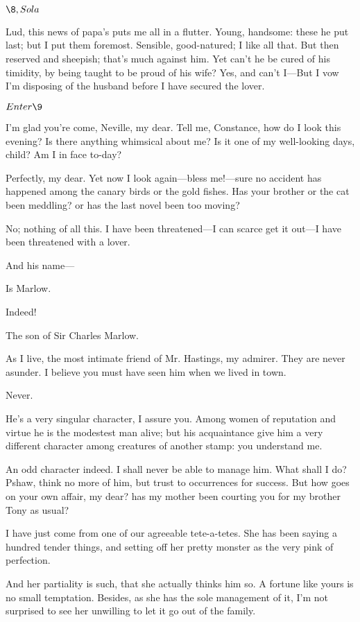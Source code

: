 \documentclass{book}
\begin{document}
    \(\8, Sola\)

\8   Lud, this news of papa's puts me all in a
flutter.  Young, handsome: these he put last; but I put them foremost. 
Sensible, good-natured; I like all that.  But then reserved and
sheepish; that's much against him.  Yet can't he be cured of his
timidity, by being taught to be proud of his wife?  Yes, and can't
I---But I vow I'm disposing of the husband before I have secured the
lover.


\(Enter \9\)


\8  I'm glad you're come, Neville, my dear.  Tell me,
Constance, how do I look this evening?  Is there anything whimsical
about me?  Is it one of my well-looking days, child?  Am I in face
to-day?

\9  Perfectly, my dear.  Yet now I look again---bless
me!---sure no accident has happened among the canary birds or the gold
fishes.  Has your brother or the cat been meddling? or has the last
novel been too moving?

\8  No; nothing of all this.  I have been threatened---I
can scarce get it out---I have been threatened with a lover.

\9  And his name---

\8  Is Marlow.

\9  Indeed!

\8  The son of Sir Charles Marlow.

\9  As I live, the most intimate friend of Mr. Hastings, my
admirer.  They are never asunder.  I believe you must have seen him
when we lived in town.

\8  Never.

\9  He's a very singular character, I assure you.  Among
women of reputation and virtue he is the modestest man alive; but his
acquaintance give him a very different character among creatures of
another stamp: you understand me.

\8  An odd character indeed.  I shall never be able to
manage him.  What shall I do?  Pshaw, think no more of him, but trust
to occurrences for success.  But how goes on your own affair, my dear?
has my mother been courting you for my brother Tony as usual?

\9  I have just come from one of our agreeable
tete-a-tetes.  She has been saying a hundred tender things, and setting
off her pretty monster as the very pink of perfection.

\8  And her partiality is such, that she actually thinks
him so.  A fortune like yours is no small temptation.  Besides, as she
has the sole management of it, I'm not surprised to see her unwilling
to let it go out of the family.
\end{document}
